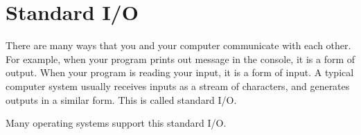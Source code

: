 \documentclass[../main.tex]{subfiles}
\begin{document}
\section{Standard I/O}
There are many ways that you and your computer communicate with each other. For
example, when your program prints out message in the console, it is a form of
output. When your program is reading your input, it is a form of input. A typical
computer system usually receives inputs as a stream of characters, and generates
outputs in a similar form. This is called standard I/O.

Many operating systems support this standard I/O.
\end{document}
